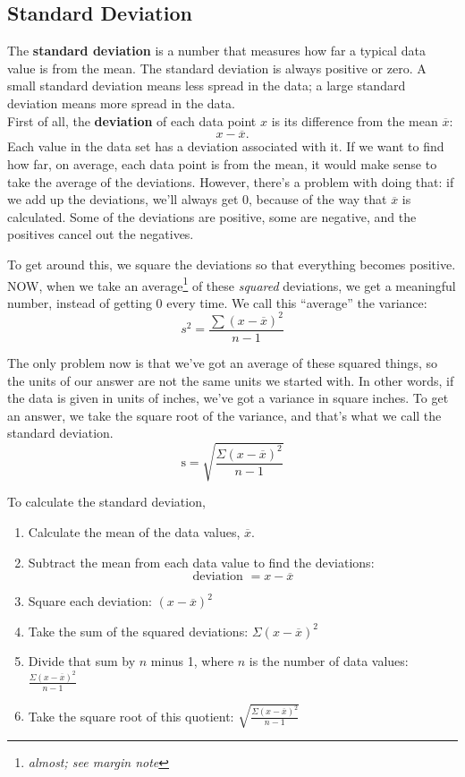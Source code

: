 \subsection{Standard Deviation}

The \textbf{standard deviation} is a number that measures how far a typical data value is from the mean. The standard deviation is always positive or zero. A small standard deviation means less spread in the data; a large standard deviation means more spread in the data.\\

First of all, the \textbf{deviation} of each data point $x$ is its difference from the mean $\overline{x}$:
\[x-\overline{x}.\]
Each value in the data set has a deviation associated with it.  If we want to find how far, on average, each data point is from the mean, it would make sense to take the average of the deviations.  However, there's a problem with doing that: if we add up the deviations, we'll always get 0, because of the way that $\overline{x}$ is calculated.  Some of the deviations are positive, some are negative, and the positives cancel out the negatives.

To get around this, we square the deviations so that everything becomes positive.  NOW, when we take an average\footnote{\textit{almost; see margin note}} of these \textit{squared} deviations, we get a meaningful number, instead of getting 0 every time.  We call this ``average'' the variance:
\[s^2 = \dfrac{\sum (x-\overline{x})^2}{n-1}\]

The only problem now is that we've got an average of these squared things, so the units of our answer are not the same units we started with.  In other words, if the data is given in units of inches, we've got a variance in square inches.  To get an answer, we take the square root of the variance, and that's what we call the standard deviation.
\[\textrm{s} = \sqrt{\frac{\Sigma (x - \overline{x})^2}{n-1}}\]

To calculate the standard deviation,
\begin{enumerate}
\item Calculate the mean of the data values, $\overline{x}$.
\item Subtract the mean from each data value to find the deviations: 
\[\textrm{deviation } = x - \overline{x}\]
\item Square each deviation: $(x - \overline{x})^2$
\item Take the sum of the squared deviations: $\Sigma (x - \overline{x})^2$
\item Divide that sum by $n$ minus 1, where $n$ is the number of data values: $\frac{\Sigma (x - \overline{x})^2}{n-1}$
\item Take the square root of this quotient: $\sqrt{\frac{\Sigma (x - \overline{x})^2}{n-1}}$
\end{enumerate}

